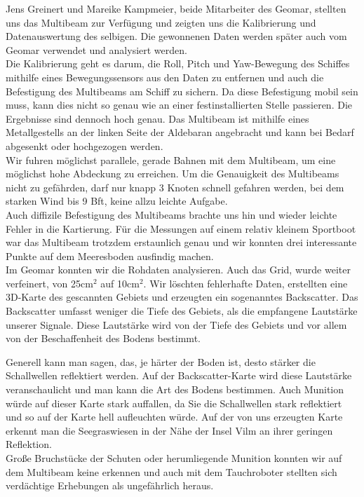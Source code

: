 Jens Greinert und Mareike Kampmeier, beide Mitarbeiter des Geomar, stellten uns das Multibeam zur Verfügung und zeigten uns die Kalibrierung und Datenauswertung des selbigen. Die gewonnenen Daten werden später auch vom Geomar verwendet und analysiert werden. \\

Die Kalibrierung geht es darum, die Roll, Pitch und Yaw-Bewegung des Schiffes mithilfe eines Bewegungssensors aus den Daten zu 
entfernen und auch die Befestigung des Multibeams am Schiff zu sichern. Da diese Befestigung mobil sein muss, kann
dies nicht so genau wie an einer festinstallierten Stelle passieren. Die Ergebnisse sind dennoch hoch genau. 
Das Multibeam ist mithilfe eines Metallgestells an der linken Seite der Aldebaran angebracht und kann bei Bedarf 
abgesenkt oder hochgezogen werden.\\

Wir fuhren möglichst parallele, gerade Bahnen mit dem Multibeam, um eine möglichst hohe Abdeckung zu erreichen. 
Um die Genauigkeit des Multibeams nicht zu gefährden, darf nur knapp 3 Knoten schnell gefahren werden, bei dem starken Wind bis 9 Bft, keine allzu leichte Aufgabe. \\

Auch diffizile Befestigung des Multibeams brachte uns hin und wieder leichte Fehler in die Kartierung. Für die Messungen auf einem relativ kleinem Sportboot war das Multibeam trotzdem erstaunlich genau und wir konnten drei interessante Punkte auf dem 
Meeresboden ausfindig machen. \\

Im Geomar konnten wir die Rohdaten analysieren. Auch das Grid, wurde weiter verfeinert, von 25cm$^2$ auf 10cm$^2$. 
Wir löschten fehlerhafte Daten, erstellten eine 3D-Karte des gescannten Gebiets und erzeugten ein sogenanntes \glqq Backscatter\grqq . 
Das Backscatter umfasst weniger die Tiefe des Gebiets, als die empfangene Lautstärke unserer Signale. 
Diese Lautstärke wird von der Tiefe des Gebiets und vor allem von der Beschaffenheit des Bodens bestimmt.

Generell kann man sagen, das, je härter der Boden ist, desto stärker die Schallwellen reflektiert werden. 
Auf der Backscatter-Karte wird diese Lautstärke veranschaulicht und man kann die Art des Bodens bestimmen.
Auch Munition würde auf dieser Karte stark auffallen, da Sie die Schallwellen stark reflektiert und so 
auf der Karte hell aufleuchten würde. Auf der von uns erzeugten Karte erkennt man die Seegraswiesen in der Nähe der Insel Vilm an ihrer geringen Reflektion.\\

Große Bruchstücke der Schuten oder herumliegende Munition konnten wir auf dem Multibeam keine erkennen und 
auch mit dem Tauchroboter stellten sich verdächtige Erhebungen als ungefährlich heraus. \\
